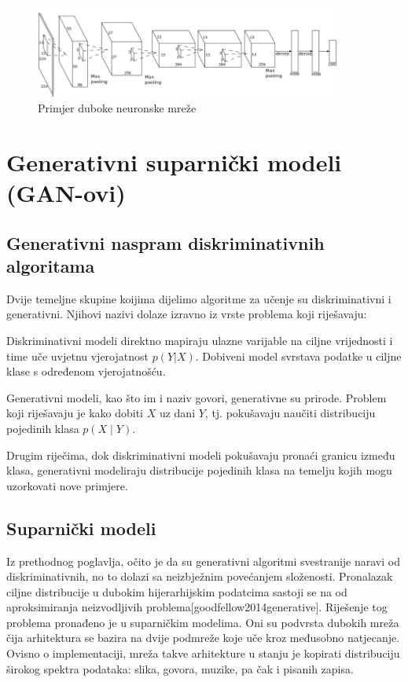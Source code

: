 \documentclass[lmodern, utf8, seminar]{fer}
\begin{document}
\begin{figure}[H]
    \centering
    \includegraphics[width=0.9\textwidth]{dnn}
    \caption{Primjer duboke neuronske mreže}
    \label{fig:dnn}
\end{figure}

\chapter{Generativni suparnički modeli (GAN-ovi)}
\section{Generativni naspram diskriminativnih algoritama}
Dvije temeljne skupine koijima dijelimo algoritme za učenje su diskriminativni i generativni.
Njihovi nazivi dolaze izravno iz vrste problema koji riješavaju: 
\newline

Diskriminativni modeli direktno mapiraju ulazne varijable na ciljne vrijednosti i time uče uvjetnu vjerojatnost $p(Y|X)$. Dobiveni model svrstava podatke u ciljne klase s određenom vjerojatnošću.

Generativni modeli, kao što im i naziv govori, generativne su prirode. Problem koji riješavaju je kako dobiti $X$ uz dani $Y$, tj. pokušavaju naučiti distribuciju pojedinih klasa $p(X \mid Y)$.
\newline

Drugim riječima, dok diskriminativni modeli pokušavaju pronaći granicu između klasa, generativni modeliraju distribucije pojedinih klasa na temelju kojih mogu uzorkovati nove primjere.
\newline

\section{Suparnički modeli}
Iz prethodnog poglavlja, očito je da su generativni algoritmi svestranije naravi od diskriminativnih, no to dolazi sa neizbježnim povećanjem složenosti. Pronalazak ciljne distribucije u dubokim hijerarhijskim podatcima sastoji se na od aproksimiranja neizvodljivih problema[goodfellow2014generative]. Riješenje tog problema pronađeno je u suparničkim modelima. Oni su podvrsta dubokih mreža čija arhitektura se bazira na dvije podmreže koje uče kroz međusobno natjecanje. Ovisno o implementaciji, mreža takve arhitekture u stanju je kopirati distribuciju širokog spektra podataka: slika, govora, muzike, pa čak i pisanih zapisa.
\newline
\end{document}
